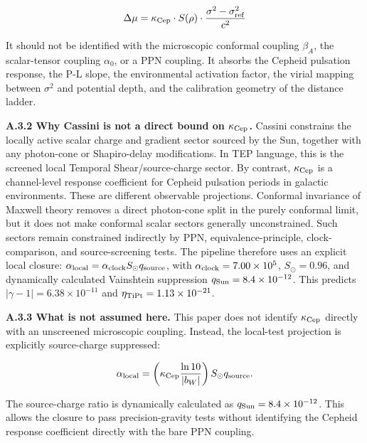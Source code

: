 \documentclass[
]{article}
\begin{document}
\begin{equation}
\Delta\mu = \kappa_{\rm Cep} \cdot S(\rho) \cdot \frac{\sigma^2 - \sigma_{\rm ref}^2}{c^2}
\label{eq:delta_mu_def}
\end{equation}

It should not be identified with the microscopic conformal coupling
\(\beta_A\), the scalar-tensor coupling \(\alpha_0\), or a PPN coupling.
It absorbs the Cepheid pulsation response, the P-L slope, the
environmental activation factor, the virial mapping between \(\sigma^2\)
and potential depth, and the calibration geometry of the distance
ladder.

\textbf{A.3.2 Why Cassini is not a direct bound on
\(\kappa_{\rm Cep}\).} Cassini constrains the locally active scalar
charge and gradient sector sourced by the Sun, together with any
photon-cone or Shapiro-delay modifications. In TEP language, this is the
screened local Temporal Shear/source-charge sector. By contrast,
\(\kappa_{\rm Cep}\) is a channel-level response coefficient for Cepheid
pulsation periods in galactic environments. These are different
observable projections. Conformal invariance of Maxwell theory removes a
direct photon-cone split in the purely conformal limit, but it does not
make conformal scalar sectors generally unconstrained. Such sectors
remain constrained indirectly by PPN, equivalence-principle,
clock-comparison, and source-screening tests. The pipeline therefore
uses an explicit local closure:
\(\alpha_{\rm local}=\alpha_{\rm clock}S_\odot q_{\rm source}\), with
\(\alpha_{\rm clock}=7.00\times10^5\), \(S_\odot=0.96\), and dynamically
calculated Vainshtein suppression \(q_{\rm Sun}=8.4\times 10^{-12}\).
This predicts \(|\gamma-1|=6.38\times 10^{-11}\) and
\(\eta_{\rm TiPt}=1.13\times 10^{-21}\).

\textbf{A.3.3 What is not assumed here.} This paper does not identify
\(\kappa_{\rm Cep}\) directly with an unscreened microscopic coupling.
Instead, the local-test projection is explicitly source-charge
suppressed:

\begin{equation}
\alpha_{\rm local}
=
\left(\kappa_{\rm Cep}\frac{\ln 10}{|b_W|}\right)
S_\odot q_{\rm source}.
\end{equation}

The source-charge ratio is dynamically calculated as
\(q_{\rm Sun}=8.4\times 10^{-12}\). This allows the closure to pass
precision-gravity tests without identifying the Cepheid response
coefficient directly with the bare PPN coupling.
\end{document}
